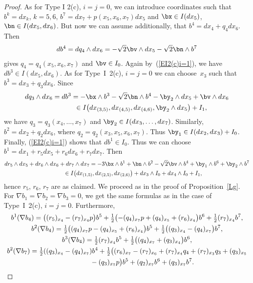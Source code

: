 \begin{proof} As for Type I 2(c), $i=j=0$, we can introduce coordinates such that $b^k=dx_k$, $k=5,6$, $b^7= dx_7 +p(x_5,x_6,x_7)dx_5$ and	 $\bx\in I(dx_5)$, $\bn\in I(dx_5,dx_6)$. But now we can assume additionally, that $b^4=dx_4+q_4 dx_6$. Then
\begin{gather*}db^4=dq_4\wedge dx_6=-\sqrt2\bv\wedge dx_5-\sqrt 2 \bn\wedge b^7\end{gather*} gives $q_4=q_4(x_5,x_6,x_7)$ and $\bv\in I_0$.
Again by~(\ref{EI2(c)i=1}), we have $db^3\in I(dx_5,dx_6)$. As for Type~I~2(c), $i=j=0$ we can choose~$x_3$ such that $b^3=dx_3+q_3dx_6$. Since
\begin{gather*}
dq_3\wedge dx_6 = db^3=-\bx\wedge b^3 -\sqrt 2\bn\wedge b^4-\by_2\wedge dx_5+\bv\wedge dx_6\\
\hphantom{dq_3\wedge dx_6}{} \in I\big(dx_{(3,5)}, dx_{(4,5)}, dx_{(4,6)}, \by_2\wedge dx_5\big)+I_1,
\end{gather*}
we have $q_3=q_3(x_4,\dots,x_7)$ and $\by_2\in I(dx_3,\dots,dx_7)$.
Similarly, $b^2=dx_2+q_2dx_6$, where $q_2=q_2(x_3,x_5,x_6,x_7)$. Thus $\by_1\in I(dx_2,dx_3)+I_0$. Finally, (\ref{EI2(c)i=1}) shows that $db^1\in I_0$. Thus we can choose $b^1=dx_1+ r_5dx_5+r_6dx_6+r_7dx_7$. Then
\begin{gather*}
 dr_5\wedge dx_5+dr_6\wedge dx_6+dr_7\wedge dx_7= -3\bx\wedge b^1+\bn\wedge b^2-\sqrt2\bv\wedge b^4+\by_1\wedge b^6+\by_2\wedge b^7 \\
 \qquad{}\in I\big( dx_{(1,5)}, dx_{(2,5)}, dx_{(2,6)}\big)+ dx_3\wedge I_0 +dx_4\wedge I_0+I_1,
\end{gather*}
hence $r_5$, $r_6$, $r_7$ are as claimed. We proceed as in the proof of Proposition~\ref{Lg}. For $\nabla b_1=\nabla b_2=\nabla b_3 =0$, we get the same formulas as in the case of Type~I~2(c), $i=j=0$. Furthermore,
\begin{gather*}
b^1(\nabla b_4)= \big((r_5)_{x_4}-(r_7)_{x_4}p\big)b^5+\tfrac12\big({-}(q_4)_{x_7}p+(q_4)_{x_5}+(r_6)_{x_4} \big)b^6 + \tfrac12(r_7)_{x_4}b^7,\\
b^2(\nabla b_4)= \tfrac12\big((q_4)_{x_7}p-(q_4)_{x_5}+(r_6)_{x_4}\big)b^5 +\tfrac12\big((q_3)_{x_4}-(q_4)_{x_7}\big)b^7,\\
b^3(\nabla b_4)= \tfrac12(r_7)_{x_4}b^5+\tfrac12\big((q_4)_{x_7}+(q_3)_{x_4}\big)b^6,\\
b^2(\nabla b_7)= \tfrac12((q_3)_{x_4}-(q_4)_{x_7})b^4 +\tfrac12\big((r_6)_{x_7} -(r_7)_{x_6}+(r_7)_{x_4}q_4+(r_7)_{x_3}q_3+(q_3)_{x_5} \\
\hphantom{b^2(\nabla b_7)=}{} -(q_3)_{x_7}p\big)b^5 +(q_2)_{x_7}b^6 +(q_3)_{x_7}b^7.

\end{gather*}
\end{proof}
